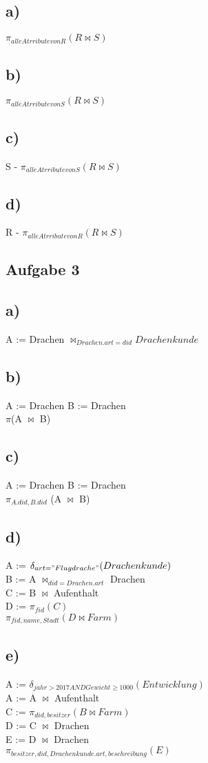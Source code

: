 \documentclass{article}
\begin{document}
	\subsection*{a)}
	$\pi_{alle Atrribute von R}(R \bowtie S)$
	\subsection*{b)}
	$\pi_{alle Atrribute von S}(R \bowtie S)$
	\subsection*{c)}
	S - $\pi_{alle Atrribute von S}(R \bowtie S)$
	\subsection*{d)}
	R - $\pi_{alle Atrribute von R}(R \bowtie S)$
	\subsection*{Aufgabe 3}
	\subsection*{a)}
	A := Drachen $\bowtie_{Drachen.art=did} Drachenkunde$
	\subsection*{b)}
	A := Drachen B := Drachen \\
	$\pi$(A $\bowtie$ B)
	\subsection*{c)}
	A := Drachen B := Drachen \\
	$\pi_{A.did, B.did}$ (A $\bowtie$ B)
	\subsection*{d)}
	A := $\delta_{art = "Flugdrache"}(Drachenkunde)$ \\
	B := A $\bowtie_{did=Drachen.art}$ Drachen \\
	C := B $\bowtie$ Aufenthalt \\
	D := $\pi_{fid}(C)$ \\
	$\pi_{fid,name,Stadt} (D \bowtie Farm)$
	\subsection*{e)}
	A := $\delta_{jahr > 2017 AND Gewicht \geq 1000}(Entwicklung)$ \\
	A := A $\bowtie$ Aufenthalt \\
	C := $\pi_{did,besitzer}(B \bowtie Farm)$ \\
	D := C $\bowtie$ Drachen  \\
	E := D $\bowtie$ Drachen \\
	$\pi_{besitzer, did, Drachenkunde.art, beschreibung}(E)$
\end{document}
